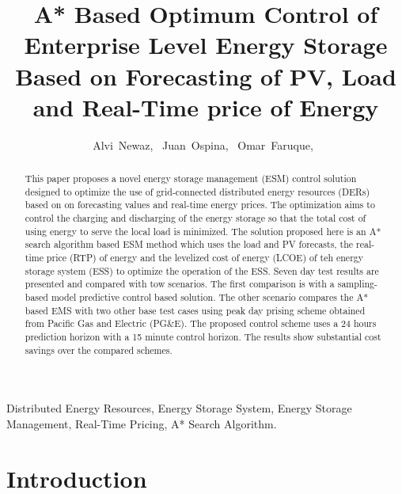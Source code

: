 \documentclass[journal]{IEEEtran}
\begin{document}
\title{A* Based Optimum Control of Enterprise Level Energy Storage Based on Forecasting of PV, Load and Real-Time price of Energy}

\author{ Alvi~Newaz,~
Juan~Ospina,~
     Omar~Faruque,~
        }%





\maketitle                                                               

\begin{abstract}
This paper proposes a novel energy storage management (ESM) control solution designed to optimize the use of grid-connected distributed energy resources (DERs) based on on forecasting values and real-time energy prices. The optimization aims to control the charging and discharging of the energy storage so that the total cost of using energy to serve the local load is minimized. The solution proposed here is an A* search algorithm based ESM method which uses the load and PV forecasts, the real-time price (RTP) of energy and the levelized cost of energy (LCOE) of teh energy storage system (ESS) to optimize the operation of the ESS. Seven day test results are presented and compared with tow scenarios. The first comparison is with a sampling-based model predictive control based solution. The other scenario compares the A* based EMS with two other base test cases using peak day prising scheme obtained from Pacific Gas and Electric (PG\&E). The proposed control scheme uses a 24 hours prediction horizon with a 15 minute control horizon. The results show substantial cost savings over the compared schemes.


\end{abstract}


\begin{IEEEkeywords}
Distributed Energy Resources, Energy Storage System, Energy Storage Management, Real-Time Pricing, A* Search Algorithm.
\end{IEEEkeywords}


\IEEEpeerreviewmaketitle



\section{Introduction}

\end{document}
